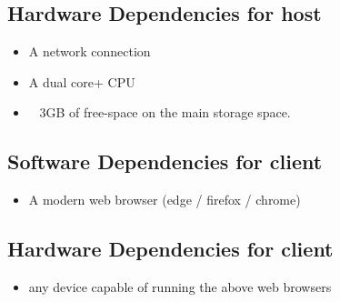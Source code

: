 \documentclass[letterpaper]{article}
\begin{document}
\subsection{Hardware Dependencies for host}
  \begin{itemize}
    \item A network connection
    \item A dual core+ CPU
    \item ~ 3GB of free-space on the main storage space.
  \end{itemize}

  \subsection{Software Dependencies for client}
    \begin{itemize}
      \item A modern web browser (edge / firefox / chrome)
    \end{itemize}

    \subsection{Hardware Dependencies for client}
      \begin{itemize}
        \item any device capable of running the above web browsers
      \end{itemize}

\pagebreak

\printindex
\listoffigures
\pagebreak
\end{document}
